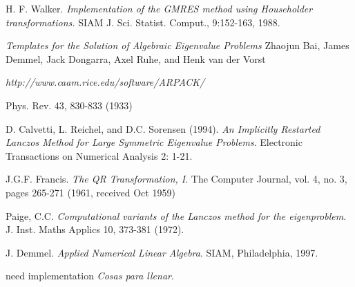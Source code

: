 \documentclass[a4paper,openright,12pt, oneside]{book}
\begin{document}
\begin{thebibliography}{X}
    H. F. Walker. 
    \emph{Implementation of the GMRES method using Householder transformations.}
    SIAM J. Sci. Statist. Comput., 9:152-163, 1988.

    \emph{Templates for the Solution of Algebraic Eigenvalue Problems}
    Zhaojun Bai, James Demmel, Jack Dongarra, Axel Ruhe, and Henk van der Vorst

    \emph{http://www.caam.rice.edu/software/ARPACK/}

    Phys. Rev. 43, 830-833 (1933)

    D. Calvetti, L. Reichel, and D.C. Sorensen (1994). 
    \emph{An Implicitly Restarted Lanczos Method for Large Symmetric Eigenvalue Problems}. 
    Electronic Transactions on Numerical Analysis 2: 1-21.

    J.G.F. Francis.
    \emph {The QR Transformation, I}.
    The Computer Journal, vol. 4, no. 3, pages 265-271 (1961, received Oct 1959) 

    Paige, C.C. 
    \emph{Computational variants of the Lanczos method for the eigenproblem}.
    J. Inst. Maths Applics 10, 373-381 (1972).

    J. Demmel. 
    \emph{Applied Numerical Linear Algebra}.
    SIAM, Philadelphia, 1997.

    need implementation
    \emph{Cosas para llenar}.

\end{thebibliography}
\end{document}
